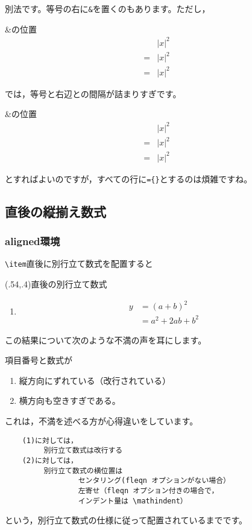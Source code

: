 \documentclass[fleqn,a4j]{jarticle}
\begin{document}
別法です。等号の右に\verb+&+を置くのもあります。ただし，
\begin{showEx}{\&の位置}
  \begin{align*}
    &|x|^2\\
    =&|x|^2\\
    =&|x|^2
  \end{align*}
\end{showEx}
では，等号と右辺との間隔が詰まりすぎです。
\begin{showEx}{\&の位置}
  \begin{align*}
    &|x|^2\\
    ={}&|x|^2\\
    ={}&|x|^2
  \end{align*}
\end{showEx}
とすればよいのですが，すべての行に\verb+={}+とするのは煩雑ですね。

\subsection{直後の縦揃え数式}
\subsubsection{\textsf{aligned}環境}
\verb+\item+直後に別行立て数式を配置すると

\begin{showEx}(.54,.4){直後の別行立て数式}
\begin{enumerate}[(1)]
  \item
    \begin{align*}
      y&=(a+b)^2\\
       &=a^2+2ab+b^2
    \end{align*}
\end{enumerate}
\end{showEx}

この結果について次のような不満の声を耳にします。
\begin{jquote}
    項目番号と数式が
    \begin{enumerate}[(1)]
      \item 縦方向にずれている（改行されている）
      \item 横方向も空きすぎである。
    \end{enumerate}
\end{jquote}
これは，不満を述べる方が心得違いをしています。
\begin{verbatim}
    (1)に対しては，
         別行立て数式は改行する
    (2)に対しては，
         別行立て数式の横位置は
                 センタリング(fleqn オプションがない場合）
                 左寄せ（fleqn オプション付きの場合で，
                 インデント量は \mathindent）
\end{verbatim}
という，別行立て数式の仕様に従って配置されているまでです。
\end{document}
